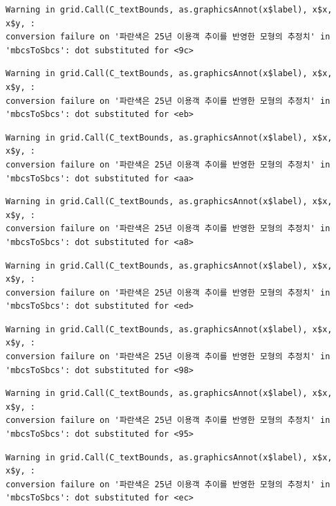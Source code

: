 \documentclass[
  letterpaper,
  DIV=11,
  numbers=noendperiod]{scrreprt}
\begin{document}
\begin{verbatim}
Warning in grid.Call(C_textBounds, as.graphicsAnnot(x$label), x$x, x$y, :
conversion failure on '파란색은 25년 이용객 추이를 반영한 모형의 추정치' in
'mbcsToSbcs': dot substituted for <9c>
\end{verbatim}

\begin{verbatim}
Warning in grid.Call(C_textBounds, as.graphicsAnnot(x$label), x$x, x$y, :
conversion failure on '파란색은 25년 이용객 추이를 반영한 모형의 추정치' in
'mbcsToSbcs': dot substituted for <eb>
\end{verbatim}

\begin{verbatim}
Warning in grid.Call(C_textBounds, as.graphicsAnnot(x$label), x$x, x$y, :
conversion failure on '파란색은 25년 이용객 추이를 반영한 모형의 추정치' in
'mbcsToSbcs': dot substituted for <aa>
\end{verbatim}

\begin{verbatim}
Warning in grid.Call(C_textBounds, as.graphicsAnnot(x$label), x$x, x$y, :
conversion failure on '파란색은 25년 이용객 추이를 반영한 모형의 추정치' in
'mbcsToSbcs': dot substituted for <a8>
\end{verbatim}

\begin{verbatim}
Warning in grid.Call(C_textBounds, as.graphicsAnnot(x$label), x$x, x$y, :
conversion failure on '파란색은 25년 이용객 추이를 반영한 모형의 추정치' in
'mbcsToSbcs': dot substituted for <ed>
\end{verbatim}

\begin{verbatim}
Warning in grid.Call(C_textBounds, as.graphicsAnnot(x$label), x$x, x$y, :
conversion failure on '파란색은 25년 이용객 추이를 반영한 모형의 추정치' in
'mbcsToSbcs': dot substituted for <98>
\end{verbatim}

\begin{verbatim}
Warning in grid.Call(C_textBounds, as.graphicsAnnot(x$label), x$x, x$y, :
conversion failure on '파란색은 25년 이용객 추이를 반영한 모형의 추정치' in
'mbcsToSbcs': dot substituted for <95>
\end{verbatim}

\begin{verbatim}
Warning in grid.Call(C_textBounds, as.graphicsAnnot(x$label), x$x, x$y, :
conversion failure on '파란색은 25년 이용객 추이를 반영한 모형의 추정치' in
'mbcsToSbcs': dot substituted for <ec>
\end{verbatim}
\end{document}
